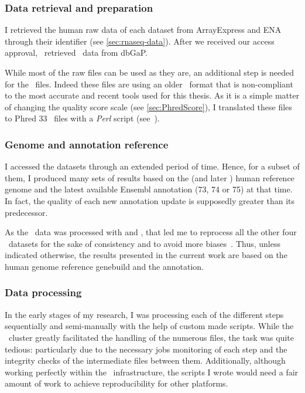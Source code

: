 \subsubsection{Data retrieval and preparation}

I retrieved the human raw data of each dataset from \gls{ArrayExpress} and
\gls{ENA} through their identifier (see \cref{sec:rnaseq-data}). After we
received our access approval, \nuno\ retrieved \Gtex\ data from
\gls{dbGaP}.

While most of the raw files can be used as they are, an additional step is
needed for the \castle\ files. Indeed these files are using an older
\fastq\ format that is non-compliant to the most accurate and recent tools used
for this thesis.
As it is a simple matter of changing the quality score scale
(see \cref{sec:PhredScore}),
I translated these files to \gls{Phred} $33$ \fastq\ files with a
\emph{\gls{Perl}} script (see~).

\subsubsection{Genome and annotation reference}

I accessed the datasets through an extended period of time. Hence, for a subset of
them, I produced many sets of results based on the 
(and later ) human reference genome and the latest available
\gls{Ensembl} annotation (73, 74 or 75) at that time.
In fact, the quality of each new annotation update is
supposedly greater than its predecessor.

As the \gtex\ data was processed with  and , that led me
to reprocess all the other four \Rnaseq\ datasets for the sake of consistency and
to avoid more biases~. Thus, unless indicated
otherwise, the results presented in the current work are
based on the  human genome reference genebuild and the 
annotation.


\subsubsection{Data processing}

In the early stages of my research, I was processing each of the different steps
sequentially and semi-manually with the help of custom made scripts. While the
\EBI\ \gls{cluster} greatly facilitated the handling of the numerous files,
the task was quite tedious: particularly due to the necessary jobs monitoring of
each step and the integrity checks of the intermediate files between them.
Additionally, although working perfectly within the \EBI\ infrastructure,
the scripts I wrote would need a fair amount of work to achieve reproducibility
for other platforms.

